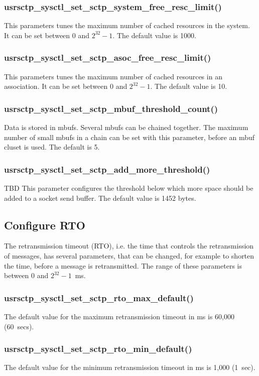 \documentclass[a4paper]{article}
\begin{document}
\subsubsection{usrsctp\_sysctl\_set\_sctp\_system\_free\_resc\_limit()}
This parameters tunes the maximum number of cached resources in the system. It can be set between 
0 and $2^{32}-1$. The default value is 1000.

\subsubsection{usrsctp\_sysctl\_set\_sctp\_asoc\_free\_resc\_limit()}
This parameters tunes the maximum number of cached resources in an association. It can be set between 
0 and $2^{32}-1$. The default value is 10.

\subsubsection{usrsctp\_sysctl\_set\_sctp\_mbuf\_threshold\_count()}
Data is stored in mbufs. Several mbufs can be chained together. The maximum number of small mbufs in a chain
can be set with this parameter, before an mbuf cluset is used. The default is 5.

\subsubsection{usrsctp\_sysctl\_set\_sctp\_add\_more\_threshold()}
TBD
This parameter configures the threshold below which more space should be added to a socket send buffer.
The default value is 1452 bytes.


\subsection{Configure RTO}
The retransmission timeout (RTO), i.e. the time that controls the retransmission of messages, has
several parameters, that can be changed, for example to shorten the time, before a message is
retransmitted. The range of these parameters is between 0 and $2^{32}-1$~ms. 

\subsubsection{usrsctp\_sysctl\_set\_sctp\_rto\_max\_default()}
The default value for the maximum retransmission timeout in ms is 60,000 (60~secs). 

\subsubsection{usrsctp\_sysctl\_set\_sctp\_rto\_min\_default()}
The default value for the minimum retransmission timeout in ms is 1,000 (1~sec). 
\end{document}

